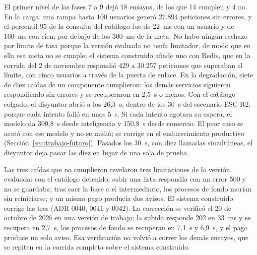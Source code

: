 El primer nivel de las fases 7 a 9 dejó 18 ensayos, de los que 14 cumplen y 4 no. En la carga, una
rampa hasta 100 usuarios generó 27.894 peticiones sin errores, y el percentil 95 de la consulta del
catálogo fue de 22~ms con un usuario y de 160~ms con cien, por debajo de los 300~ms de la meta. No
hubo ningún rechazo por límite de tasa porque la versión evaluada no tenía limitador, de modo que en
ella esa meta no se cumple; el sistema construido añade uno con Redis, que en la corrida del 2 de noviembre respondió 429 a
30.257 peticiones que superaban el límite, con cinco usuarios a través de la puerta de enlace. En la degradación, siete de diez caídas de un componente cumplieron: los demás servicios
siguieron respondiendo sin errores y se recuperaron en 2,5~s o menos. Con el catálogo colgado, el
disyuntor abrió a los 26,3~s, dentro de los 30~s del escenario ESC-R2, porque cada intento falló
en unos 5~s. Si cada intento agotara su espera, el modelo da 300,8~s desde inteligencia y 150,8~s
desde comercio. El peor caso se acotó con ese modelo y no se midió; se corrige en el endurecimiento productivo
(Sección~\ref{sec:trabajo-futuro}). Pasados los
30~s, con diez llamadas simultáneas, el disyuntor deja pasar las diez en lugar de una sola de
prueba.

Las tres caídas que no cumplieron revelaron tres limitaciones de la versión evaluada: con el
catálogo detenido, subir una lista respondía con un error 500 y no se guardaba; tras caer la base o
el intermediario, los procesos de fondo morían sin reiniciarse; y un mismo pago producía dos avisos.
El sistema construido corrige las tres (ADR 0040, 0041 y 0042). La corrección se verificó el 20 de
octubre de 2026 en una versión de trabajo: la subida responde 202 en 33~ms y se recupera en 2,7~s,
los procesos de fondo se recuperan en 7,1~s y 6,9~s, y el pago produce un solo aviso. Esa
verificación no volvió a correr los demás ensayos, que se repiten en la corrida completa sobre el
sistema construido.


